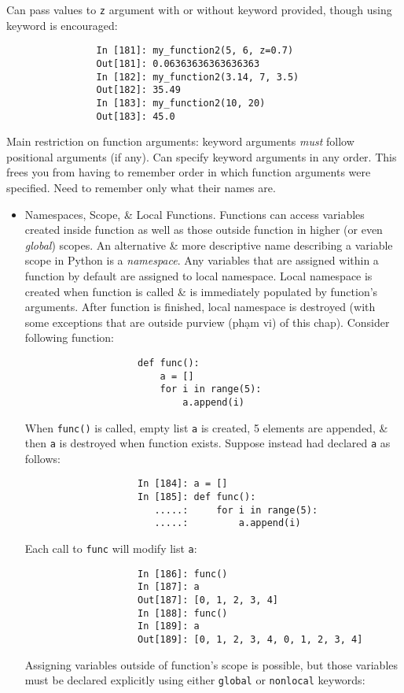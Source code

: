 \documentclass{article}
\begin{document}
\begin{enumerate}
\begin{itemize}
\begin{itemize}
			Can pass values to {\tt z} argument with or without keyword provided, though using keyword is encouraged:
			\begin{verbatim}
				In [181]: my_function2(5, 6, z=0.7)
				Out[181]: 0.06363636363636363
				In [182]: my_function2(3.14, 7, 3.5)
				Out[182]: 35.49
				In [183]: my_function2(10, 20)
				Out[183]: 45.0
			\end{verbatim}
			Main restriction on function arguments: keyword arguments {\it must} follow positional arguments (if any). Can specify keyword arguments in any order. This frees you from having to remember order in which function arguments were specified. Need to remember only what their names are.
			\begin{itemize}
				\item {\sf Namespaces, Scope, \& Local Functions.} Functions can access variables created inside function as well as those outside function in higher (or even {\it global}) scopes. An alternative \& more descriptive name describing a variable scope in Python is a {\it namespace}. Any variables that are assigned within a function by default are assigned to local namespace. Local namespace is created when function is called \& is immediately populated by function's arguments. After function is finished, local namespace is destroyed (with some exceptions that are outside purview (phạm vi) of this chap). Consider following function:
				\begin{verbatim}
					def func():
					    a = []
					    for i in range(5):
					        a.append(i)
				\end{verbatim}
				When {\tt func()} is called, empty list {\tt a} is created, 5 elements are appended, \& then {\tt a} is destroyed when function exists. Suppose instead had declared {\tt a} as follows:
				\begin{verbatim}
					In [184]: a = []
					In [185]: def func():
					   .....:     for i in range(5):
					   .....:         a.append(i)
				\end{verbatim}
				Each call to {\tt func} will modify list {\tt a}:
				\begin{verbatim}
					In [186]: func()
					In [187]: a
					Out[187]: [0, 1, 2, 3, 4]
					In [188]: func()
					In [189]: a
					Out[189]: [0, 1, 2, 3, 4, 0, 1, 2, 3, 4]
				\end{verbatim}
				Assigning variables outside of function's scope is possible, but those variables must be declared explicitly using either {\tt global} or {\tt nonlocal} keywords:
				\begin{verbatim}

\end{verbatim}
\end{itemize}
\end{itemize}
\end{itemize}
\end{enumerate}
\end{document}
